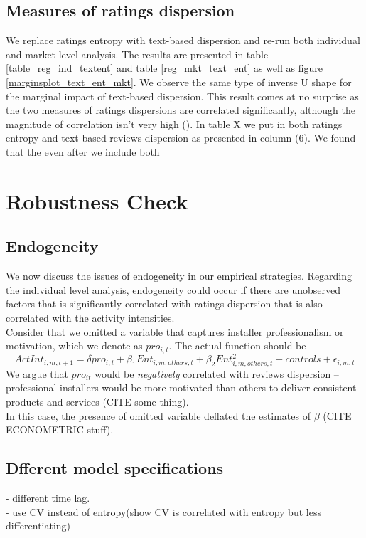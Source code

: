 \documentclass[msom,blindrev]{informs3}
\begin{document}
\subsection{Measures of ratings dispersion}
We replace ratings entropy with text-based dispersion and re-run both individual and market level analysis. The results are presented in table \ref{table_reg_ind_textent} and table \ref{reg_mkt_text_ent} as well as figure \ref{marginsplot_text_ent_mkt}. We observe the same type of inverse U shape for the marginal impact of text-based dispersion. This result comes at no surprise as the two measures of ratings dispersions are correlated significantly, although the magnitude of correlation isn't very high (). In table X we put in both ratings entropy and text-based reviews dispersion as presented in column (6). We found that the even after we include both  \\ 



\section{Robustness Check}
\subsection{Endogeneity} 
We now discuss the issues of endogeneity in our empirical strategies. Regarding the individual level analysis, endogeneity could occur if there are unobserved factors that is significantly correlated with ratings dispersion that is also correlated with the activity intensities.\\
Consider that we omitted a variable that captures installer professionalism or motivation, which we denote as $pro_{i,t}$. The actual function should be 
\begin{equation}
ActInt_{i,m,t+1}=\delta pro_{i,t}+\beta_{1} Ent_{i,m,others,t}+\beta_{2}Ent_{i,m,others,t}^2+controls+\epsilon_{i,m,t} 
\end{equation} 
We argue that $pro_{it}$ would be \textit{negatively} correlated with reviews dispersion -- professional installers would be more motivated than others to deliver consistent products and services (CITE some thing).  \\

In this case, the presence of omitted variable deflated the estimates of $\beta$ (CITE ECONOMETRIC stuff). \\
\subsection{Dfferent model specifications}
- different time lag.  \\
- use CV instead of entropy(show CV is correlated with entropy but less differentiating) \\ 
\end{document}
